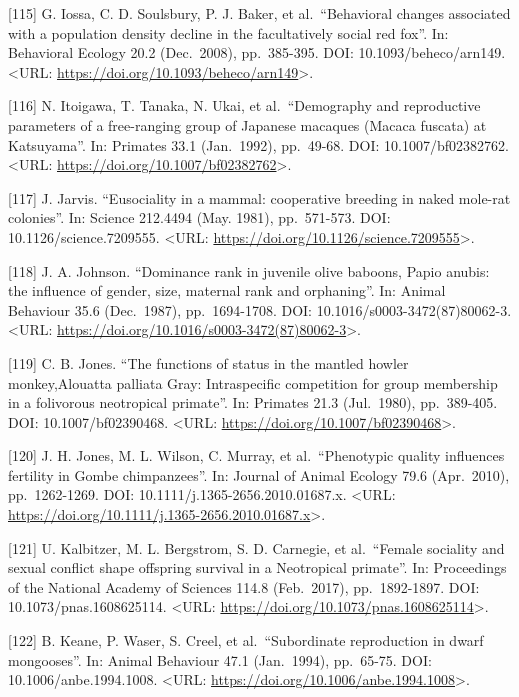\documentclass[
]{article}
\begin{document}
{[}115{]} G. Iossa, C. D. Soulsbury, P. J. Baker, et al.~``Behavioral
changes associated with a population density decline in the
facultatively social red fox''. In: Behavioral Ecology 20.2 (Dec.~2008),
pp.~385-395. DOI: 10.1093/beheco/arn149. \textless URL:
\url{https://doi.org/10.1093/beheco/arn149}\textgreater.

{[}116{]} N. Itoigawa, T. Tanaka, N. Ukai, et al.~``Demography and
reproductive parameters of a free-ranging group of Japanese macaques
(Macaca fuscata) at Katsuyama''. In: Primates 33.1 (Jan.~1992),
pp.~49-68. DOI: 10.1007/bf02382762. \textless URL:
\url{https://doi.org/10.1007/bf02382762}\textgreater.

{[}117{]} J. Jarvis. ``Eusociality in a mammal: cooperative breeding in
naked mole-rat colonies''. In: Science 212.4494 (May. 1981),
pp.~571-573. DOI: 10.1126/science.7209555. \textless URL:
\url{https://doi.org/10.1126/science.7209555}\textgreater.

{[}118{]} J. A. Johnson. ``Dominance rank in juvenile olive baboons,
Papio anubis: the influence of gender, size, maternal rank and
orphaning''. In: Animal Behaviour 35.6 (Dec.~1987), pp.~1694-1708. DOI:
10.1016/s0003-3472(87)80062-3. \textless URL:
\url{https://doi.org/10.1016/s0003-3472(87)80062-3}\textgreater.

{[}119{]} C. B. Jones. ``The functions of status in the mantled howler
monkey,Alouatta palliata Gray: Intraspecific competition for group
membership in a folivorous neotropical primate''. In: Primates 21.3
(Jul.~1980), pp.~389-405. DOI: 10.1007/bf02390468. \textless URL:
\url{https://doi.org/10.1007/bf02390468}\textgreater.

{[}120{]} J. H. Jones, M. L. Wilson, C. Murray, et al.~``Phenotypic
quality influences fertility in Gombe chimpanzees''. In: Journal of
Animal Ecology 79.6 (Apr.~2010), pp.~1262-1269. DOI:
10.1111/j.1365-2656.2010.01687.x. \textless URL:
\url{https://doi.org/10.1111/j.1365-2656.2010.01687.x}\textgreater.

{[}121{]} U. Kalbitzer, M. L. Bergstrom, S. D. Carnegie, et al.~``Female
sociality and sexual conflict shape offspring survival in a Neotropical
primate''. In: Proceedings of the National Academy of Sciences 114.8
(Feb.~2017), pp.~1892-1897. DOI: 10.1073/pnas.1608625114. \textless URL:
\url{https://doi.org/10.1073/pnas.1608625114}\textgreater.

{[}122{]} B. Keane, P. Waser, S. Creel, et al.~``Subordinate
reproduction in dwarf mongooses''. In: Animal Behaviour 47.1
(Jan.~1994), pp.~65-75. DOI: 10.1006/anbe.1994.1008. \textless URL:
\url{https://doi.org/10.1006/anbe.1994.1008}\textgreater.
\end{document}
